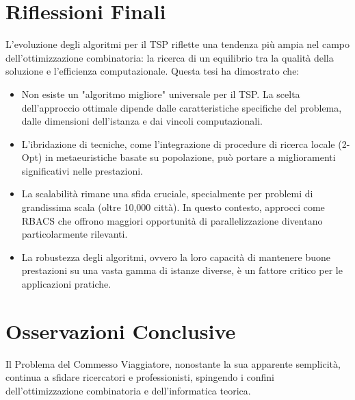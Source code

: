 \section{Riflessioni Finali}
L'evoluzione degli algoritmi per il TSP riflette una tendenza più ampia nel campo dell'ottimizzazione combinatoria: la ricerca di un equilibrio tra la qualità della soluzione e l'efficienza computazionale. Questa tesi ha dimostrato che:

\begin{itemize}
	\item Non esiste un "algoritmo migliore" universale per il TSP. La scelta dell'approccio ottimale dipende dalle caratteristiche specifiche del problema, dalle dimensioni dell'istanza e dai vincoli computazionali.

	\item L'ibridazione di tecniche, come l'integrazione di procedure di ricerca locale (2-Opt) in metaeuristiche basate su popolazione, può portare a miglioramenti significativi nelle prestazioni.

	\item La scalabilità rimane una sfida cruciale, specialmente per problemi di grandissima scala (oltre 10,000 città). In questo contesto, approcci come RBACS che offrono maggiori opportunità di parallelizzazione diventano particolarmente rilevanti.

	\item La robustezza degli algoritmi, ovvero la loro capacità di mantenere buone prestazioni su una vasta gamma di istanze diverse, è un fattore critico per le applicazioni pratiche.
\end{itemize}

\section{Osservazioni Conclusive}
Il Problema del Commesso Viaggiatore, nonostante la sua apparente semplicità, continua a sfidare ricercatori e professionisti, spingendo i confini dell'ottimizzazione combinatoria e dell'informatica teorica.
